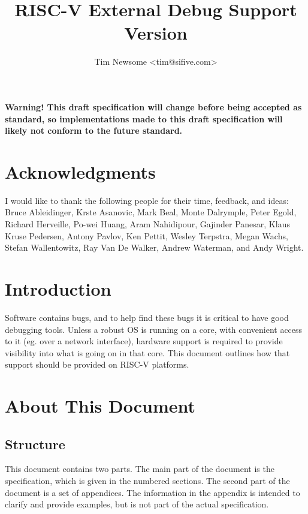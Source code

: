 \documentclass{article}
\title{RISC-V External Debug Support\\
Version \versionnum\\
\GITHash
}
\author{Tim Newsome \textless tim@sifive.com\textgreater}
\date{\GITAuthorDate}
\begin{document}
\maketitle

{\bf Warning! This draft specification will change before being accepted as
standard, so implementations made to this draft specification will likely not
conform to the future standard.}

\tableofcontents
\listoffigures
\listoftables

\newpage

\section*{Acknowledgments}

I would like to thank the following people for their time, feedback, and ideas:
Bruce Ableidinger,
Krste Asanovic,
Mark Beal,
Monte Dalrymple,
Peter Egold,
Richard Herveille,
Po-wei Huang,
Aram Nahidipour,
Gajinder Panesar,
Klaus Kruse Pedersen,
Antony Pavlov,
Ken Pettit,
Wesley Terpstra,
Megan Wachs,
Stefan Wallentowitz,
Ray Van De Walker,
Andrew Waterman,
and Andy Wright.

\section{Introduction}

Software contains bugs, and to help find these bugs it is critical to have good
debugging tools. Unless a robust OS is running on a core, with convenient
access to it (eg. over a network interface), hardware support is required to
provide visibility into what is going on in that core.  This document outlines
how that support should be provided on RISC-V platforms.

\section{About This Document}

\subsection{Structure}

This document contains two parts. The main part of the document is the
specification, which is given in the numbered sections. The second part
of the document is a set of  appendices. The information
in the appendix is intended to clarify and provide examples, but is
not part of the actual specification.
\end{document}
